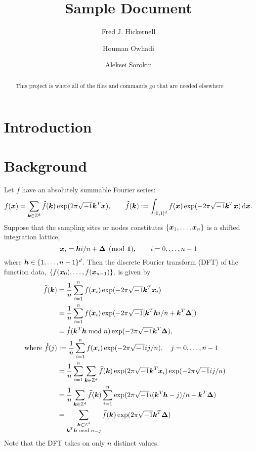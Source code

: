 \documentclass{amsart}
\begin{document}
\title{Sample Document}
\author{Fred J. Hickernell}
\author{Houman Owhadi}
\author{Aleksei Sorokin}
\begin{abstract}This project is where all of the files and commands go that are needed elsewhere
\end{abstract}

\maketitle

\section{Introduction}

\section{Background}
Let $f$ have an absolutely summable Fourier series:
\begin{equation*}
    f(\boldsymbol{x}) = \sum_{\boldsymbol{k} \in \mathbb{Z}^d} \widehat{f}(\boldsymbol{k}) \exp(2 \pi \sqrt{-1} \boldsymbol{k}^T \boldsymbol{x}), \qquad \widehat{f}(\boldsymbol{k}) : = \int_{[0,1]^d} f(\boldsymbol{x})  \exp(-2 \pi \sqrt{-1} \boldsymbol{k}^T \boldsymbol{x}) \, {\rm d} \boldsymbol{x}.
\end{equation*}
Suppose that the sampling sites or nodes constitutes $\{ \boldsymbol{x}_1, \ldots, \boldsymbol{x}_n\}$ is a shifted integration lattice, 
\begin{equation} \label{eq:shift_lat}
    \boldsymbol{x}_i = \boldsymbol{h} i /n + \boldsymbol{\Delta} \pmod {\boldsymbol{1}}, \qquad i = 0, \ldots, n - 1
\end{equation}
where $\boldsymbol{h} \in \{1, \ldots, n-1\}^d$.  Then the discrete Fourier transform (DFT) of the function data, $\{ f(\boldsymbol{x}_0), \ldots, f(\boldsymbol{x}_{n-1})\}$, is given by 
\begin{align}
\nonumber
    \widetilde{f}(\boldsymbol{k}) &= \frac 1n \sum_{i=1}^n f(\boldsymbol{x}_i) \exp(-2 \pi \sqrt{-1} \boldsymbol{k}^T \boldsymbol{x}_i) \\
\nonumber
    & = \frac 1n \sum_{i=1}^n f(\boldsymbol{x}_i) \exp(-2 \pi \sqrt{-1} [\boldsymbol{k}^T\boldsymbol{h} i/n + \boldsymbol{k}^T\boldsymbol{\Delta}]) \\
\nonumber
    & = \mathring{f}(\boldsymbol{k}^T \boldsymbol{h} \bmod n) \exp(-2 \pi \sqrt{-1} \boldsymbol{k}^T\boldsymbol{\Delta}), \\
    \text{where } 
    \mathring{f}(j) &: = \frac 1n \sum_{i=1}^n f(\boldsymbol{x}_i) \exp(-2 \pi \sqrt{-1} ij/n), \quad  j = 0, \ldots, n-1 \qquad \label{eq:fring}\\
\nonumber
    & = \frac 1n \sum_{i=1}^n \sum_{\boldsymbol{k} \in \mathbb{Z}^d} \widehat{f}(\boldsymbol{k}) \exp(2 \pi \sqrt{-1} \boldsymbol{k}^T \boldsymbol{x}_i) \exp(-2 \pi \sqrt{-1} ij/n) \\
\nonumber
    & = \frac 1n \sum_{\boldsymbol{k} \in \mathbb{Z}^d} \widehat{f}(\boldsymbol{k}) \sum_{i=1}^n \exp(2 \pi \sqrt{-1} i (\boldsymbol{k}^T \boldsymbol{h} - j) /n + \boldsymbol{k}^T \boldsymbol{\Delta}) \\
\nonumber
    & = \sum_{\substack{\boldsymbol{k} \in \mathbb{Z}^d \\ \boldsymbol{k}^T \boldsymbol{h} \bmod n = j}} \widehat{f}(\boldsymbol{k}) \exp(2 \pi \sqrt{-1} \boldsymbol{k}^T \boldsymbol{\Delta}) \\
\end{align}
Note that the DFT takes on only $n$ distinct values. 
\end{document}
